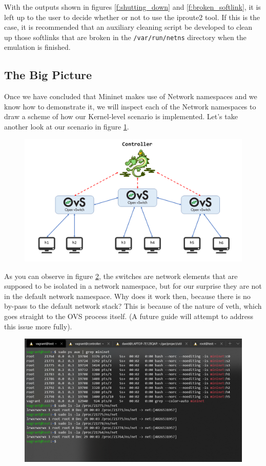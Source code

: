 \documentclass[12pt]{article}
\newcommand{\newpar} {
    \vskip 1cm
}
\begin{document}
			With the outputs shown in figures \ref{f:shutting_down} and \ref{f:broken_softlink}, it is left up to the user to decide whether or not to use the iproute2 tool. If this is the case, it is recommended that an auxiliary cleaning script be developed to clean up those softlinks that are broken in the \texttt{/var/run/netns} directory when the emulation is finished.
            \newpar
            
	\subsection{The Big Picture}
		Once we have concluded that Mininet makes use of Network namespaces and we know how to demonstrate it, we will inspect each of the Network namespaces to draw a scheme of how our Kernel-level scenario is implemented. Let's take another look at our scenario in figure \ref{f:scenario_prime}.
        \newpage
		\begin{figure}[!htb]
			\centering
			\includegraphics[width=0.8\linewidth]{scenario.png}
			\label{f:scenario_prime}
		\end{figure}
        
		As you can observe in figure \ref{f:switches}, the switches are network elements that are supposed to be isolated in a network namespace, but for our surprise they are not in the default network namespace. Why does it work then, because there is no by-pass to the default network stack? This is because of the nature of veth, which goes straight to the OVS process itself. (A future guide will attempt to address this issue more fully).

		\begin{figure}[!htb]
			\centering
			\includegraphics[width=\linewidth]{switches_ln.png}
			\label{f:switches}
		\end{figure}
\end{document}
